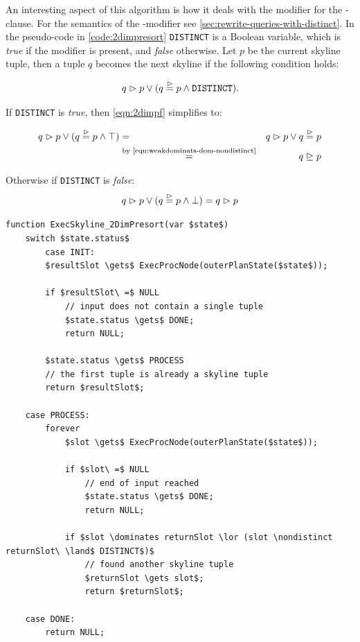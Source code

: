 An interesting aspect of this algorithm is how it deals with the
 modifier for the -clause.
%
For the semantics of the -modifier see
\autoref{sec:rewrite-queries-with-distinct}.
%
In the pseudo-code in \autoref{code:2dimpresort} \texttt{DISTINCT}
is a Boolean variable, which is \emph{true} if the
 modifier is present, and \emph{false}
otherwise. Let $p$ be the current skyline tuple, then a tuple $q$
becomes the next skyline if the following condition holds:

\begin{equation}\label{eqn:2dimpf}
q \vartriangleright p \lor (q \stackrel{\vartriangleright}{=} p \land \text{\texttt{DISTINCT}}).
\end{equation}

\noindent
If \texttt{DISTINCT} is \emph{true}, then \eqref{eqn:2dimpf} simplifies to:

\begin{eqnarray}
q \vartriangleright p \lor (q \stackrel{\vartriangleright}{=} p \land \top) &=& q \vartriangleright p \lor q \stackrel{\vartriangleright}{=} p \nonumber\\
&\stackrel{\textnormal{by \eqref{eqn:weakdominats-dom-nondistinct}}}{=}& q \trianglerighteq p
\end{eqnarray}

\noindent
Otherwise if \texttt{DISTINCT} is \emph{false}:
%
\begin{equation}
q \vartriangleright p \lor (q \stackrel{\vartriangleright}{=} p \land \bot) = q \vartriangleright p
\end{equation}

\pagebreak[4]
\begin{lstlisting}[language=pseudo,
caption={Pseudo-code for Special case: 2 dimensional with presort},
label={code:2dimpresort}
]
function ExecSkyline_2DimPresort(var $state$)
	switch $state.status$
        case INIT:
		$resultSlot \gets$ ExecProcNode(outerPlanState($state$));

		if $resultSlot\ =$ NULL
			// input does not contain a single tuple
			$state.status \gets$ DONE;
			return NULL;

		$state.status \gets$ PROCESS
		// the first tuple is already a skyline tuple
		return $resultSlot$;

	case PROCESS:
		forever
			$slot \gets$ ExecProcNode(outerPlanState($state$));

			if $slot\ =$ NULL
				// end of input reached
				$state.status \gets$ DONE;
				return NULL;

			if $slot \dominates returnSlot \lor (slot \nondistinct returnSlot\ \land$ DISTINCT$)$
				// found another skyline tuple
				$returnSlot \gets slot$;
				return $returnSlot$;

	case DONE:
		return NULL;
\end{lstlisting}

